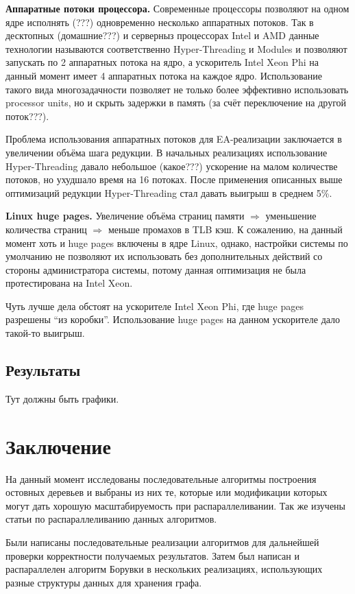 \documentclass{article}
\begin{document}
\textbf{Аппаратные потоки процессора.}
Современные процессоры позволяют на одном ядре исполнять (???) одновременно несколько аппаратных потоков. Так в десктопных (домашние???) и серверныз процессорах Intel и AMD данные технологии называются соответственно Hyper-Threading и Modules и позволяют запускать по 2 аппаратных потока на ядро, а ускоритель Intel Xeon Phi на данный момент имеет 4 аппаратных потока на каждое ядро. Использование такого вида многозадачности позволяет не только более эффективно использовать processor units, но и скрыть задержки в память (за счёт переключение на другой поток???).

Проблема использования аппаратных потоков для EA-реализации заключается в увеличении объёма шага редукции. В начальных реализациях использование Hyper-Threading давало небольшое (какое???) ускорение на малом количестве потоков, но ухудшало время на 16 потоках. После применения описанных выше оптимизаций редукции Hyper-Threading стал давать выигрыш в среднем 5\%.



\textbf{Linux huge pages.}
Увеличение объёма страниц памяти $\Rightarrow$ уменьшение количества страниц $\Rightarrow$ меньше промахов в TLB кэш.
К сожалению, на данный момент хоть и huge pages включены в ядре Linux, однако, настройки системы по умолчанию не позволяют их использовать без дополнительных действий со стороны администратора системы, потому данная оптимизация не была протестирована на Intel Xeon.

Чуть лучше дела обстоят на ускорителе Intel Xeon Phi, где huge pages разрешены ``из коробки''. Использование huge pages на данном ускорителе дало такой-то выигрыш.


\subsection{Результаты}
Тут должны быть графики.

\newpage
\section{Заключение}
На данный момент исследованы последовательные алгоритмы построения остовных деревьев и выбраны из них те, которые или модификации которых могут дать хорошую масштабируемость при распараллеливании. Так же изучены статьи  \cite{dense-mst,boruvka-prima,boruvka-cm5} по распараллеливанию данных алгоритмов.

Были написаны последовательные реализации алгоритмов для дальнейшей проверки корректности получаемых результатов. Затем был написан и распараллелен алгоритм Борувки в нескольких реализациях, использующих разные структуры данных для хранения графа.
\end{document}
